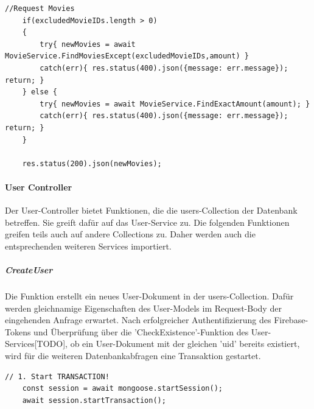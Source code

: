 \begin{lstlisting}[caption=MovieController - RequestMovie - Excluded Movies, label=lst:MovieControllerExcludedMovies]
    //Request Movies
    if(excludedMovieIDs.length > 0)
    {
        try{ newMovies = await MovieService.FindMoviesExcept(excludedMovieIDs,amount) } 
        catch(err){ res.status(400).json({message: err.message}); return; }
    } else {
        try{ newMovies = await MovieService.FindExactAmount(amount); } 
        catch(err){ res.status(400).json({message: err.message}); return; }
    }

    res.status(200).json(newMovies);
\end{lstlisting}




%
%



\paragraph{User Controller}
Der User-Controller bietet Funktionen, die die users-Collection der Datenbank betreffen. Sie greift dafür auf das User-Service zu. Die folgenden Funktionen greifen teils auch auf andere Collections zu. Daher werden auch die entsprechenden weiteren Services importiert.

\subparagraph{CreateUser}
Die Funktion erstellt ein neues User-Dokument in der users-Collection. Dafür werden gleichnamige Eigenschaften des User-Models im Request-Body der eingehenden Anfrage erwartet. Nach erfolgreicher Authentifizierung des Firebase-Tokens und Überprüfung über die 'CheckExistence'-Funktion des User-Services[TODO], ob ein User-Dokument mit der gleichen 'uid' bereits existiert, wird für die weiteren Datenbankabfragen eine Transaktion gestartet.

\begin{lstlisting}[caption=UserController - Create User - Transaktionsstart, label=lst:UserControllertransaction]
    // 1. Start TRANSACTION!
    const session = await mongoose.startSession();
    await session.startTransaction();
\end{lstlisting}

